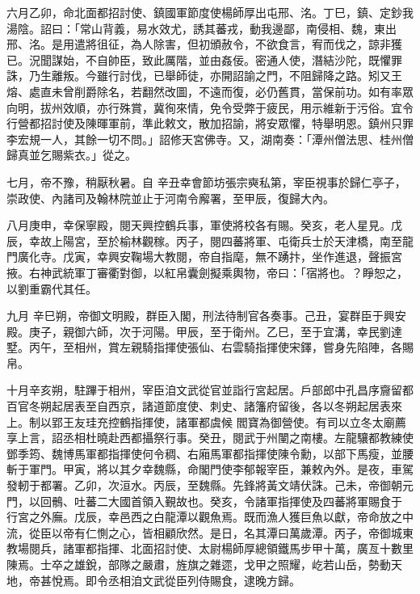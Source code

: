 \begin{pinyinscope}
 六月乙卯，命北面都招討使、鎮國軍節度使楊師厚出屯邢、洺。丁巳，鎮、定鈔我湯陰。詔曰：「常山背義，易水效尤，誘其蕃戎，動我邊鄙，南侵相、魏，東出邢、洺。是用遣將徂征，為人除害，但初頒赦令，不欲食言，宥而伐之，諒非獲已。況聞謀始，不自帥臣，致此厲階，並由姦佞。密通人使，潛結沙陀，既懼罪
 誅，乃生離叛。今雖行討伐，已舉師徒，亦開詔諭之門，不阻歸降之路。矧又王熔、處直未曾削爵除名，若翻然改圖，不遠而復，必仍舊貫，當保前功。如有率眾向明，拔州效順，亦行殊賞，冀徇來情，免令受弊于疲民，用示維新于污俗。宜令行營都招討使及陳暉軍前，準此敕文，散加招諭，將安眾懼，特舉明恩。鎮州只罪李宏規一人，其餘一切不問。」詔修天宮佛寺。又，湖南奏：「潭州僧法思、桂州僧歸真並乞賜紫衣。」從之。



 七月，帝不豫，稍厭秋暑。自
 辛丑幸會節坊張宗奭私第，宰臣視事於歸仁亭子，崇政使、內諸司及翰林院並止于河南令廨署，至甲辰，復歸大內。



 八月庚申，幸保寧殿，閱天興控鶴兵事，軍使將校各有賜。癸亥，老人星見。戊辰，幸故上陽宮，至於榆林觀稼。丙子，閱四蕃將軍、屯衛兵士於天津橋，南至龍門廣化寺。戊寅，幸興安鞠場大教閱，帝自指麾，無不踴抃，坐作進退，聲振宮掖。右神武統軍丁審衢對御，以紅帛囊劍擬乘輿物，帝曰：「宿將也。？睜恕之，以劉重霸代其任。



 九月
 辛巳朔，帝御文明殿，群臣入閣，刑法待制官各奏事。己丑，宴群臣于興安殿。庚子，親御六師，次于河陽。甲辰，至于衛州。乙巳，至于宜溝，幸民劉達墅。丙午，至相州，賞左親騎指揮使張仙、右雲騎指揮使宋鐸，嘗身先陷陣，各賜帛。



 十月辛亥朔，駐蹕于相州，宰臣洎文武從官並詣行宮起居。戶部郎中孔昌序齎留都百官冬朔起居表至自西京，諸道節度使、刺史、諸籓府留後，各以冬朔起居表來上。制以郢王友珪充控鶴指揮使，諸軍都虞候
 閻寶為御營使。有司以立冬太廟薦享上言，詔丞相杜曉赴西都攝祭行事。癸丑，閱武于州闉之南樓。左龍驤都教練使鄧季筠、魏博馬軍都指揮使何令稠、右廂馬軍都指揮使陳令勳，以部下馬瘦，並腰斬于軍門。甲寅，將以其夕幸魏縣，命閣門使李郁報宰臣，兼敕內外。是夜，車駕發軔于都署。乙卯，次洹水。丙辰，至魏縣。先鋒將黃文靖伏誅。己未，帝御朝元門，以回鶻、吐蕃二大國首領入覲故也。癸亥，令諸軍指揮使及四蕃將軍賜食于
 行宮之外廡。戊辰，幸邑西之白龍潭以觀魚焉。既而漁人獲巨魚以獻，帝命放之中流，從臣以帝有仁惻之心，皆相顧欣然。是日，名其潭曰萬歲潭。丙子，帝御城東教場閱兵，諸軍都指揮、北面招討使、太尉楊師厚總領鐵馬步甲十萬，廣亙十數里陳焉。士卒之雄銳，部隊之嚴肅，旌旗之雜遝，戈甲之照耀，屹若山岳，勢動天地，帝甚悅焉。即令丞相洎文武從臣列侍賜食，逮晚方歸。



\end{pinyinscope}
